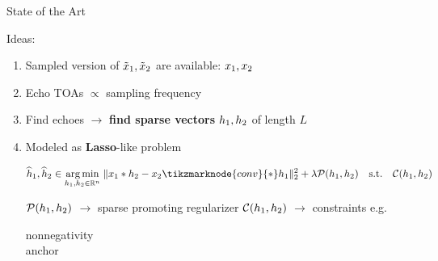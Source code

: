 \begin{frame}{State of the Art \hfill\faBook}
    \begin{block}{Ideas:}
    \begin{enumerate}
        \small
        \item Sampled version of $\tilde{x}_1,\tilde{x}_2$ are available: $x_1, x_2$
        \item Echo TOAs $\propto$ sampling frequency
        \item Find echoes $\rightarrow$ \textbf{find sparse vectors} $h_1, h_2$ of length $L$
        \item Modeled as \textbf{Lasso}-like problem

        \vspace*{2mm}
        \begin{mysotablock}
            \begin{equation*}
                \widehat{\discRIR}_1, \widehat{\discRIR}_2 \in
                \underset{\discRIR_1, \discRIR_2\in\kR^n}{\arg\min}\;
                \Vert \discMic_1 \contConv \discRIR_2 - \discMic_2 \tikzmarknode{conv}{\contConv} \discRIR_1 \Vert_2^2
                + \lambda \mathcal{P}(\discRIR_1, \discRIR_2)
                \quad\text{s.t.}\quad\mathcal{C}(\discRIR_1, \discRIR_2)
            \end{equation*}

            \vspace*{-2mm}
            \begin{center}
                \footnotesize
                $\mathcal{P}(h_1, h_2)$ $\longrightarrow$ sparse promoting regularizer
                \hspace{5mm} \footnotesize $\mathcal{C}(h_1, h_2)$ $\longrightarrow$ constraints e.g. \parbox{6em}{nonnegativity\\anchor}
            \end{center}
        \end{mysotablock}
    \end{enumerate}
    \end{block}

    \vspace{-12mm}
    \begin{block}{}
        \begin{center}
            \footnotesize
            \textcolor{mygreen}{\cmark}  \cite{tong1994blind} \qquad \textcolor{mygreen}{\cmark}  \cite{lin2008blind} \qquad \textcolor{mygreen}{\cmark} \cite{aissa2008blind} \\
            \textcolor{mygreen}{\cmark} \cite{kowalczyk2013blind} \qquad \textcolor{mygreen}{\cmark} \cite{crocco2016estimation}
        \end{center}
    \end{block}


\end{frame}
